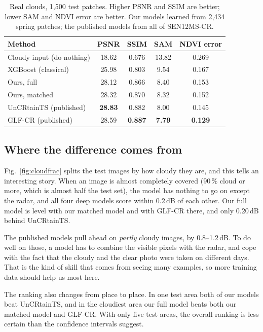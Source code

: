 \documentclass[conference]{IEEEtran}
\newcommand{\best}[1]{\textbf{#1}}
\begin{document}
\begin{table}[t]
\centering
\caption{Real clouds, 1,500 test patches. Higher PSNR and SSIM are better; lower SAM and NDVI
error are better. Our models learned from 2,434 spring patches; the published models from all of
SEN12MS-CR.}
\label{tab:main}
\setlength{\tabcolsep}{4pt}
\begin{tabular}{lcccc}
\toprule
Method & PSNR & SSIM & SAM & NDVI error \\
\midrule
Cloudy input (do nothing) & 18.62 & 0.676 & 13.82 & 0.269 \\
XGBoost (classical) & 25.98 & 0.803 & 9.54 & 0.167 \\
Ours, full & 28.12 & 0.866 & 8.40 & 0.153 \\
Ours, matched & 28.32 & 0.870 & 8.32 & 0.152 \\
UnCRtainTS (published) & \best{28.83} & 0.882 & 8.00 & 0.145 \\
GLF-CR (published) & 28.59 & \best{0.887} & \best{7.79} & \best{0.129} \\
\bottomrule
\end{tabular}
\end{table}

\subsection{Where the difference comes from}
Fig.~\ref{fig:cloudfrac} splits the test images by how cloudy they are, and this tells an
interesting story. When an image is almost completely covered (90\,\% cloud or more, which is
almost half the test set), the model has nothing to go on except the radar, and all four deep
models score within 0.2\,dB of each other. Our full model is level with our matched model and with
GLF-CR there, and only 0.20\,dB behind UnCRtainTS.

The published models pull ahead on \emph{partly} cloudy images, by 0.8--1.2\,dB. To do well on
those, a model has to combine the visible pixels with the radar, and cope with the fact that the
cloudy and the clear photo were taken on different days. That is the kind of skill that comes from
seeing many examples, so more training data should help us most here.

The ranking also changes from place to place. In one test area both of our models beat
UnCRtainTS, and in the cloudiest area our full model beats both our matched model and GLF-CR.
With only five test areas, the overall ranking is less certain than the confidence intervals
suggest.
\end{document}
